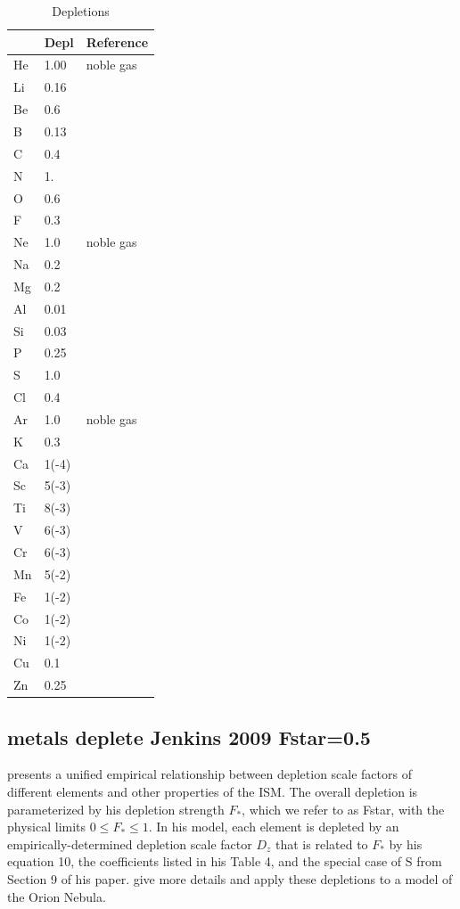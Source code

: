 \begin{table}
\centering
\caption{Depletions}
\label{tab:GrainGasDepletionFactors}
\begin{tabular}{lll}\hline
&Depl& Reference\\
\hline
He& 1.00& noble gas\\
Li& 0.16& \citealp{White1986}\\
Be& 0.6& \citealp{York1982}\\
B& 0.13& \citealp{Federman1993}\\
C& 0.4\\
N& 1.\\
O& 0.6\\
F& 0.3& \citealp{Snow1981}\\
Ne& 1.0& noble gas\\
Na& 0.2\\
Mg& 0.2\\
Al& 0.01\\
Si& 0.03\\
P& 0.25& \citealp{Cardelli1991}\\
S& 1.0\\
Cl& 0.4\\
Ar&1.0& noble gas\\
K& 0.3& \citealp{Chaffee1982}\\
Ca& 1(-4)\\
Sc& 5(-3)& \citealp{Snow1980}\\
Ti& 8(-3)& \citealp{Crinklaw1994}\\
V& 6(-3)& \citealp{Cardelli1994}\\
Cr& 6(-3)& \citealp{Cardelli1991}\\
Mn& 5(-2)& \citealp{Cardelli1991}\\
Fe& 1(-2)\\
Co& 1(-2)\\
Ni& 1(-2)\\
Cu& 0.1& \citealp{Cardelli1991}\\
Zn& 0.25& \citealp{Cardelli1991}\\
\hline
\end{tabular}
\end{table}

\subsection{metals deplete Jenkins 2009 Fstar=0.5}

\citet{2009ApJ...700.1299J} presents a unified empirical relationship between depletion
scale factors of different elements and other properties of the ISM.  
The overall depletion is parameterized by his depletion strength $F_*$, which we refer to as Fstar,
with the physical limits $0\leq F_* \leq 1$.
In his model, each element is depleted by an empirically-determined depletion scale factor $D_z$ that
is related to $F_*$ by his equation 10, the coefficients listed in his Table 4, 
and the special case of S from Section 9 of his paper.
 give more details and apply
these depletions to a model of the Orion Nebula.

